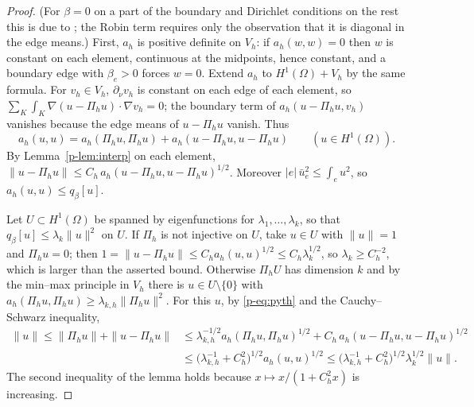 \documentclass[11pt]{article}
\theoremstyle{remark}
\begin{document}
\begin{proof}
(For $\beta=0$ on a part of the boundary and Dirichlet conditions on the rest this is due to
\cite{CG,Liu}; the Robin term requires only the observation that it is diagonal in the edge
means.) First, $a_h$ is positive definite on $V_h$: if $a_h(w,w)=0$ then $w$ is constant on each
element, continuous at the midpoints, hence constant, and a boundary edge with $\beta_e>0$
forces $w=0$. Extend $a_h$ to $H^1(\Omega)+V_h$ by the same formula. For $v_h\in V_h$,
$\partial_\nu v_h$ is constant on each edge of each element, so
$\sum_K\int_K\nabla(u-\Pi_hu)\cdot\nabla v_h=0$; the boundary term of $a_h(u-\Pi_hu,v_h)$
vanishes because the edge means of $u-\Pi_hu$ vanish. Thus
\begin{equation}\label{p-eq:pyth}
  a_h(u,u)=a_h(\Pi_hu,\Pi_hu)+a_h(u-\Pi_hu,u-\Pi_hu)\qquad(u\in H^1(\Omega)).
\end{equation}
By Lemma~\ref{p-lem:interp} on each element,
$\|u-\Pi_hu\|\le C_h\,a_h(u-\Pi_hu,u-\Pi_hu)^{1/2}$. Moreover $|e|\,\bar u_e^2\le\int_eu^2$, so
$a_h(u,u)\le q_\beta[u]$.

Let $U\subset H^1(\Omega)$ be spanned by eigenfunctions for $\lambda_1,\dots,\lambda_k$, so that
$q_\beta[u]\le\lambda_k\|u\|^2$ on $U$. If $\Pi_h$ is not injective on $U$, take $u\in U$ with
$\|u\|=1$ and $\Pi_hu=0$; then $1=\|u-\Pi_hu\|\le C_ha_h(u,u)^{1/2}\le C_h\lambda_k^{1/2}$, so
$\lambda_k\ge C_h^{-2}$, which is larger than the asserted bound. Otherwise $\Pi_hU$ has
dimension $k$ and by the min--max principle in $V_h$ there is $u\in U\setminus\{0\}$ with
$a_h(\Pi_hu,\Pi_hu)\ge\lambda_{k,h}\|\Pi_hu\|^2$. For this $u$, by \eqref{p-eq:pyth} and the
Cauchy--Schwarz inequality,
\begin{align*}
  \|u\|\le\|\Pi_hu\|+\|u-\Pi_hu\|
  &\le\lambda_{k,h}^{-1/2}a_h(\Pi_hu,\Pi_hu)^{1/2}+C_h\,a_h(u-\Pi_hu,u-\Pi_hu)^{1/2}\\
  &\le\bigl(\lambda_{k,h}^{-1}+C_h^2\bigr)^{1/2}a_h(u,u)^{1/2}
  \le\bigl(\lambda_{k,h}^{-1}+C_h^2\bigr)^{1/2}\lambda_k^{1/2}\|u\| .
\end{align*}
The second inequality of the lemma holds because $x\mapsto x/(1+C_h^2x)$ is increasing.
\end{proof}
\end{document}
